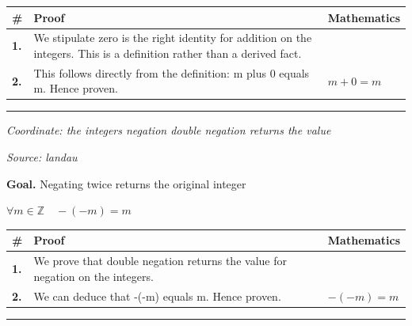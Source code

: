 \documentclass[11pt]{article}
\theoremstyle{definition}
\begin{document}
\medskip
\noindent
\begin{tabular}{@{} >{\raggedright\arraybackslash}p{} >{\raggedright\arraybackslash}p{} >{\raggedleft\arraybackslash}p{} @{}}
\textbf{\#} & \textbf{Proof} & \textbf{Mathematics} \\
\midrule
\textbf{1.} & We stipulate zero is the right identity for addition on the integers. This is a definition rather than a derived fact. & \\[0.45em]
\textbf{2.} & This follows directly from the definition: m plus 0 equals m. Hence proven. & $\displaystyle m + 0 = m$ \\[0.45em]
\bottomrule
\end{tabular}
\label{thm:Int-addition-zero_is_the_right_identity}
\par\medskip\hrule
\bigskip
{}\par
\smallskip\noindent\textit{Coordinate: the integers \cdot negation \cdot double negation returns the value}\par
\smallskip\noindent\textit{Source: landau}\par
\medskip
\noindent\textbf{Goal.} Negating twice returns the original integer\par
\noindent$\displaystyle \forall m \in \mathbb{Z}\quad -(-m) = m$\par
\medskip
\noindent
\begin{tabular}{@{} >{\raggedright\arraybackslash}p{} >{\raggedright\arraybackslash}p{} >{\raggedleft\arraybackslash}p{} @{}}
\textbf{\#} & \textbf{Proof} & \textbf{Mathematics} \\
\midrule
\textbf{1.} & We prove that double negation returns the value for negation on the integers. & \\[0.45em]
\textbf{2.} & We can deduce that -(-m) equals m. Hence proven. & $\displaystyle -(-m) = m$ \\[0.45em]
\bottomrule
\end{tabular}
\label{thm:Int-negation-double_negation_returns_the_value}
\par\medskip\hrule
\end{document}
